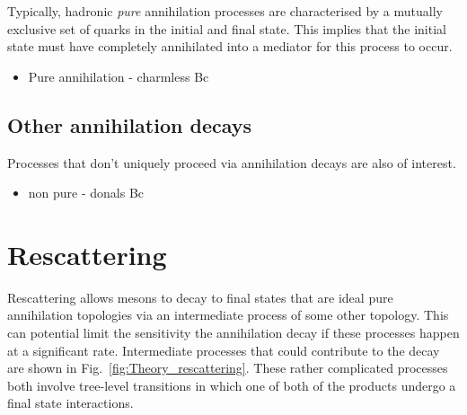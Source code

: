 Typically, hadronic \emph{pure} annihilation processes are characterised by a mutually exclusive set of quarks in the initial and final state. This implies that the initial state must have completely annihilated into a mediator for this process to occur.   

{\color{Red}
\begin{itemize}
\item Pure annihilation - charmless Bc
\end{itemize}}

\subsection{Other annihilation decays}
Processes that don't uniquely proceed via annihilation decays are also of interest. 
{\color{Red}
\begin{itemize}
\item non pure - donals Bc 
\end{itemize}}

\section{Rescattering}

Rescattering allows \Bp mesons to decay to final states that are ideal pure annihilation topologies via an intermediate process of some other topology. This can potential limit the sensitivity the annihilation decay if these processes happen at a significant rate. Intermediate processes that could contribute to the \decay{\Bp}{\Dsp\phiz} decay are shown in Fig.~\ref{fig:Theory_rescattering}. These rather complicated processes both involve tree-level \decay{\bquarkbar}{\uquarkbar} transitions in which one of both of the products undergo a final state interactions.  

